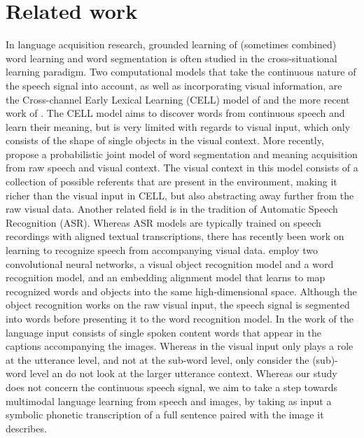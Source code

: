 \section{Related work}

In language acquisition research, grounded learning of (sometimes combined) word learning and word segmentation is often studied in the cross-situational learning paradigm. %
Two computational models that take the continuous nature of the speech signal into account, as well as incorporating visual information, are the Cross-channel Early Lexical Learning (CELL) model of  and the more recent work of . The CELL model aims to discover words from continuous speech and learn their meaning, but is very limited with regards to visual input, which only consists of the shape of single objects in the visual context. More recently,  propose a probabilistic joint model of word segmentation and meaning acquisition from raw speech and visual context. The visual context in this model consists of a collection of possible referents that are present in the environment, making it richer than the visual input in CELL, but also abstracting away further from the raw visual data. %
Another related field is in the tradition of Automatic Speech Recognition (ASR). Whereas ASR models are typically trained on speech recordings with aligned textual transcriptions, there has recently been work on learning to recognize speech from accompanying visual data.
 employ two convolutional neural networks, a visual object recognition model and a word recognition model, and an embedding alignment model that learns to map recognized words and objects into the same high-dimensional space. Although the object recognition works on the raw visual input, the speech signal is segmented into words before presenting it to the word recognition model. In the work of  the language input consists of single spoken content words that appear in the captions accompanying the images. %
Whereas in  the visual input only plays a role at the utterance level, and not at the sub-word level,  only consider the (sub)-word level an do not look at the larger utterance context. Whereas our study does not concern the continuous speech signal, we aim to take a step towards multimodal language learning from speech and images, by taking as input a symbolic phonetic transcription of a full sentence paired with the image it describes.

